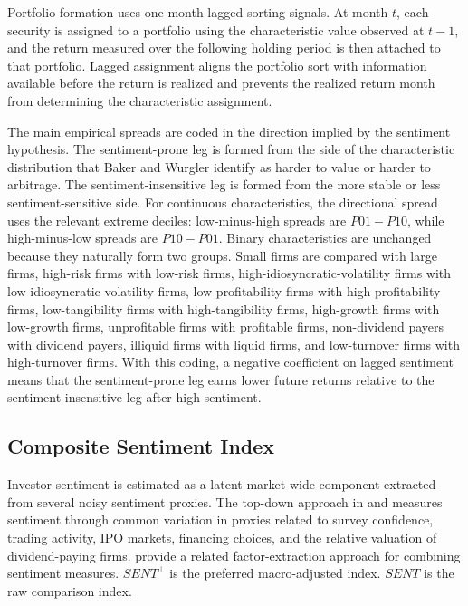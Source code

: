 \documentclass[11pt]{article}
\newcommand{\var}[1]{\ensuremath{#1}}
\begin{document}
Portfolio formation uses one-month lagged sorting signals. At month \var{t}, each security is assigned to a portfolio using the characteristic value observed at \var{t-1}, and the return measured over the following holding period is then attached to that portfolio. Lagged assignment aligns the portfolio sort with information available before the return is realized and prevents the realized return month from determining the characteristic assignment.

The main empirical spreads are coded in the direction implied by the sentiment hypothesis. The sentiment-prone leg is formed from the side of the characteristic distribution that Baker and Wurgler identify as harder to value or harder to arbitrage. The sentiment-insensitive leg is formed from the more stable or less sentiment-sensitive side. For continuous characteristics, the directional spread uses the relevant extreme deciles: low-minus-high spreads are \var{P01-P10}, while high-minus-low spreads are \var{P10-P01}. Binary characteristics are unchanged because they naturally form two groups. Small firms are compared with large firms, high-risk firms with low-risk firms, high-idiosyncratic-volatility firms with low-idiosyncratic-volatility firms, low-profitability firms with high-profitability firms, low-tangibility firms with high-tangibility firms, high-growth firms with low-growth firms, unprofitable firms with profitable firms, non-dividend payers with dividend payers, illiquid firms with liquid firms, and low-turnover firms with high-turnover firms. With this coding, a negative coefficient on lagged sentiment means that the sentiment-prone leg earns lower future returns relative to the sentiment-insensitive leg after high sentiment.

\subsection{Composite Sentiment Index}
Investor sentiment is estimated as a latent market-wide component extracted from several noisy sentiment proxies. The top-down approach in \citet{baker2006sentiment} and \citet{baker2007} measures sentiment through common variation in proxies related to survey confidence, trading activity, IPO markets, financing choices, and the relative valuation of dividend-paying firms. \citet{brown2004cliff} provide a related factor-extraction approach for combining sentiment measures. \var{SENT^{\perp}} is the preferred macro-adjusted index. \var{SENT} is the raw comparison index.
\end{document}
